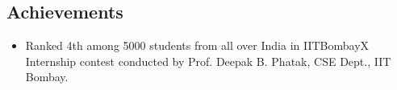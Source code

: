 \documentclass[11pt,margin, centered]{res}
\begin{document}
\begin{resume}

\section{Achievements}
\vspace{12mm}
\begin{itemize}[leftmargin=*]
\item Ranked 4th among 5000 students from all over India in IITBombayX Internship contest conducted by Prof. Deepak B. Phatak, CSE Dept., IIT Bombay.
\end{itemize}


\end{resume}
\end{document}
